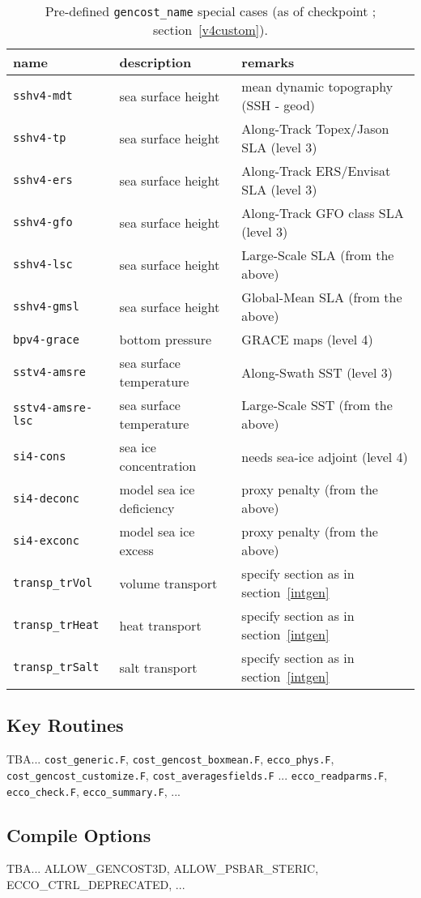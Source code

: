 \begin{table}[!ht]
\centering
\begin{tabular}{lll}
name					&	description				&	remarks \\ \hline\hline
\texttt{sshv4-mdt}			&	sea surface height			&	mean dynamic topography (SSH - geod) \\
\texttt{sshv4-tp}				&	sea surface height			&	Along-Track Topex/Jason SLA (level 3) \\
\texttt{sshv4-ers}			&	sea surface height			&	Along-Track ERS/Envisat SLA (level 3)\\
\texttt{sshv4-gfo}			&	sea surface height			&	Along-Track GFO class SLA (level 3)\\
\texttt{sshv4-lsc}			&	sea surface height			&	Large-Scale SLA (from the above)\\
\texttt{sshv4-gmsl}			&	sea surface height			&	Global-Mean SLA (from the above)\\ \hline
\texttt{bpv4-grace}			&	bottom pressure			&	GRACE maps (level 4) \\ \hline
\texttt{sstv4-amsre}			&	sea surface temperature		&	Along-Swath SST (level 3)\\
\texttt{sstv4-amsre-lsc}		&	sea surface temperature		&	Large-Scale SST (from the above)\\ \hline
\texttt{si4-cons}				&	sea ice concentration		& 	needs sea-ice adjoint (level 4)\\
\texttt{si4-deconc}			&	model sea ice deficiency		& 	proxy penalty (from the above)\\
\texttt{si4-exconc}			&	model sea ice excess		& 	proxy penalty (from the above)\\ \hline
\texttt{transp\_trVol}			&	volume transport			& specify section as in section~\ref{intgen}\\ 
\texttt{transp\_trHeat}		&	heat transport				& specify section as in section~\ref{intgen} \\ 
\texttt{transp\_trSalt}			&	salt transport				& specify section as in section~\ref{intgen} \\ 
\end{tabular}
\caption{Pre-defined \texttt{gencost\_name} special cases (as of checkpoint \mitgcmCheckpointVersion; section~\ref{v4custom}).}
\label{tbl:gencost_ecco_name}
\end{table}

\subsection{Key Routines}

TBA... \texttt{cost\_generic.F}, \texttt{cost\_gencost\_boxmean.F}, \texttt{ecco\_phys.F}, \texttt{cost\_gencost\_customize.F}, \texttt{cost\_averagesfields.F} ... \texttt{ecco\_readparms.F}, \texttt{ecco\_check.F}, \texttt{ecco\_summary.F}, ...

\subsection{Compile Options}

TBA... ALLOW\_GENCOST3D, ALLOW\_PSBAR\_STERIC, ECCO\_CTRL\_DEPRECATED, ...

